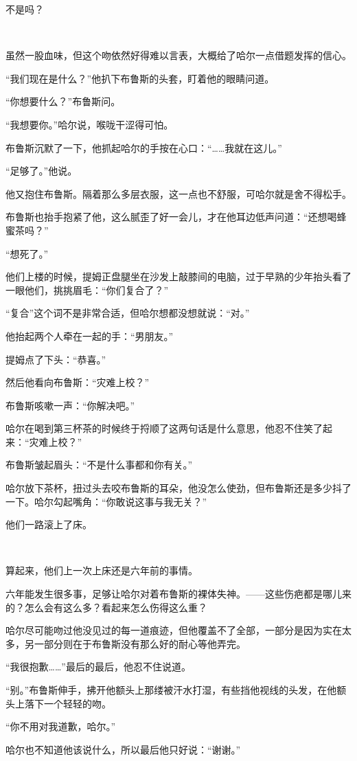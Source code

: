 \documentclass[../main]{subfiles}
\begin{document}
不是吗？

~\

虽然一股血味，但这个吻依然好得难以言表，大概给了哈尔一点借题发挥的信心。

“我们现在是什么？”他扒下布鲁斯的头套，盯着他的眼睛问道。

“你想要什么？”布鲁斯问。

“我想要你。”哈尔说，喉咙干涩得可怕。

布鲁斯沉默了一下，他抓起哈尔的手按在心口：“……我就在这儿。”

“足够了。”他说。

他又抱住布鲁斯。隔着那么多层衣服，这一点也不舒服，可哈尔就是舍不得松手。

布鲁斯也抬手抱紧了他，这么腻歪了好一会儿，才在他耳边低声问道：“还想喝蜂蜜茶吗？”

“想死了。”

他们上楼的时候，提姆正盘腿坐在沙发上敲膝间的电脑，过于早熟的少年抬头看了一眼他们，挑挑眉毛：“你们复合了？”

“复合”这个词不是非常合适，但哈尔想都没想就说：“对。”

他抬起两个人牵在一起的手：“男朋友。”

提姆点了下头：“恭喜。”

然后他看向布鲁斯：“灾难上校？”

布鲁斯咳嗽一声：“你解决吧。”

哈尔在喝到第三杯茶的时候终于捋顺了这两句话是什么意思，他忍不住笑了起来：“灾难上校？”

布鲁斯皱起眉头：“不是什么事都和你有关。”

哈尔放下茶杯，扭过头去咬布鲁斯的耳朵，他没怎么使劲，但布鲁斯还是多少抖了一下。哈尔勾起嘴角：“你敢说这事与我无关？”

他们一路滚上了床。

~\

算起来，他们上一次上床还是六年前的事情。

六年能发生很多事，足够让哈尔对着布鲁斯的裸体失神。——这些伤疤都是哪儿来的？怎么会有这么多？看起来怎么伤得这么重？

哈尔尽可能吻过他没见过的每一道痕迹，但他覆盖不了全部，一部分是因为实在太多，另一部分则在于布鲁斯没有那么好的耐心等他弄完。

“我很抱歉……”最后的最后，他忍不住说道。

“别。”布鲁斯伸手，拂开他额头上那缕被汗水打湿，有些挡他视线的头发，在他额头上落下一个轻轻的吻。

“你不用对我道歉，哈尔。”

哈尔也不知道他该说什么，所以最后他只好说：“谢谢。”
\end{document}
